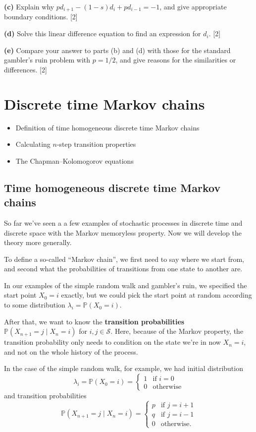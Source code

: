 \documentclass[
  a4paper,
]{article}
\providecommand{\tightlist}{%
  \setlength{\itemsep}{0pt}\setlength{\parskip}{0pt}}
\theoremstyle{definition}
\theoremstyle{definition}
\theoremstyle{definition}
\theoremstyle{remark}
\begin{document}
\textbf{(c)} Explain why \(pd_{i+1} - (1-s)d_i + pd_{i-1} = -1\), and give appropriate boundary conditions. {{[}2{]}}

\textbf{(d)} Solve this linear difference equation to find an expression for \(d_i\). {{[}2{]}}

\textbf{(e)} Compare your answer to parts (b) and (d) with those for the standard gambler's ruin problem with \(p = 1/2\), and give reasons for the similarities or differences. {{[}2{]}}

\hypertarget{S05-markov-chains}{%
\section{Discrete time Markov chains}\label{S05-markov-chains}}

\begin{itemize}
\tightlist
\item
  Definition of time homogeneous discrete time Markov chains
\item
  Calculating \(n\)-step transition properties
\item
  The Chapman--Kolomogorov equations
\end{itemize}

\hypertarget{thmc}{%
\subsection{Time homogeneous discrete time Markov chains}\label{thmc}}

So far we've seen a a few examples of stochastic processes in discrete time and discrete space with the Markov memoryless property. Now we will develop the theory more generally.

To define a so-called ``Markov chain'', we first need to say where we start from, and second what the probabilities of transitions from one state to another are.

In our examples of the simple random walk and gambler's ruin, we specified the start point \(X_0 = i\) exactly, but we could pick the start point at random according to some distribution \(\lambda_i = \mathbb P(X_0 = i)\).

After that, we want to know the \textbf{transition probabilities} \(\mathbb P(X_{n+1} = j \mid X_n = i)\) for \(i,j \in \mathcal S\). Here, because of the Markov property, the transition probability only needs to condition on the state we're in now \(X_n = i\), and not on the whole history of the process.

In the case of the simple random walk, for example, we had initial distribution
\[ \lambda_i = \mathbb P(X_0 = i) = \begin{cases} 1 & \text{if $i = 0$} \\ 0 & \text{otherwise} \end{cases} \]
and transition probabilities
\[ \mathbb P(X_{n+1} = j \mid X_n = i) = \begin{cases} p & \text{if $j = i+1$} \\ q & \text{if $j = i-1$} \\ 0 & \text{otherwise.} \end{cases} \]
\end{document}

